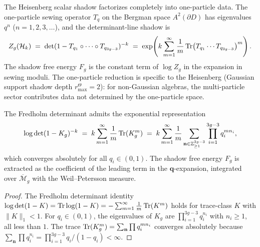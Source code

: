 \begin{remark}
The Heisenberg scalar shadow factorizes completely into one-particle data. The one-particle sewing operator $T_q$ on the Bergman space $A^2(\partial D)$ has eigenvalues $q^n$ ($n = 1, 2, 3, \ldots$), and the determinant-line shadow is
\[
Z_g(\mathcal{H}_k) \;=\; \det(1 - T_{q_1} \circ \cdots \circ T_{q_{3g-3}})^{-k} \;=\; \exp\!\left( k \sum_{m=1}^{\infty} \frac{1}{m} \operatorname{Tr}\bigl(T_{q_1} \cdots T_{q_{3g-3}}\bigr)^m \right).
\]
The shadow free energy $F_g$ is the constant term of $\log Z_g$ in the expansion in sewing moduli. The one-particle reduction is specific to the Heisenberg (Gaussian support shadow depth \(r^\Theta_{\max}=2\)): for non-Gaussian algebras, the multi-particle sector contributes data not determined by the one-particle space.
\end{remark}

\begin{proposition}
The Fredholm determinant admits the exponential representation
\begin{equation}%
\log \det(1 - K_g)^{-k} \;=\; k \sum_{m=1}^\infty \frac{1}{m} \Tr(K_g^m) \;=\; k \sum_{m=1}^\infty \frac{1}{m} \sum_{\mathbf{n} \in \mathbb{Z}_{\geq 1}^{3g-3}} \prod_{i=1}^{3g-3} q_i^{m n_i},
\end{equation}
which converges absolutely for all $q_i \in (0,1)$. The shadow free energy $F_g$ is extracted as the coefficient of the leading term in the $\mathbf{q}$-expansion, integrated over $\overline{\mathcal{M}}_g$ with the Weil--Petersson measure.
\end{proposition}

\begin{proof}
The Fredholm determinant identity $\log\det(1 - K) = \operatorname{Tr}\log(1 - K) = -\sum_{m=1}^\infty \frac{1}{m}\operatorname{Tr}(K^m)$ holds for trace-class $K$ with $\|K\|_1 < 1$. For $q_i \in (0,1)$, the eigenvalues of $K_g$ are $\prod_{i=1}^{3g-3} q_i^{n_i}$ with $n_i \geq 1$, all less than $1$. The trace $\operatorname{Tr}(K_g^m) = \sum_{\mathbf{n}} \prod q_i^{mn_i}$ converges absolutely because $\sum_{\mathbf{n}} \prod q_i^{n_i} = \prod_{i=1}^{3g-3} q_i/(1-q_i) < \infty$.
\end{proof}

